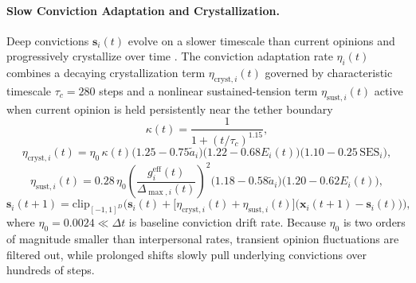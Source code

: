 \documentclass{article}
\begin{document}
\paragraph{Slow Conviction Adaptation and Crystallization.}
Deep convictions $\mathbf{s}_i(t)$ evolve on a slower timescale than current opinions and progressively crystallize over time \citep{alwin1991aging, kiley2020measuring}. The conviction adaptation rate $\eta_i(t)$ combines a decaying crystallization term $\eta_{\mathrm{cryst}, i}(t)$ governed by characteristic timescale $\tau_c = 280$ steps and a nonlinear sustained-tension term $\eta_{\mathrm{sust}, i}(t)$ active when current opinion is held persistently near the tether boundary
\begin{equation}
    \kappa(t) = \frac{1}{1 + (t / \tau_c)^{1.15}},
    \label{eq:crystallization_factor}
\end{equation}
\begin{equation}
    \eta_{\mathrm{cryst}, i}(t) = \eta_0 \,\kappa(t) \big(1.25 - 0.75\tilde{a}_i\big)\big(1.22 - 0.68 E_i(t)\big)\big(1.10 - 0.25\,\mathrm{SES}_i\big),
    \label{eq:eta_cryst}
\end{equation}
\begin{equation}
    \eta_{\mathrm{sust}, i}(t) = 0.28\,\eta_0 \left(\frac{g_i^{\mathrm{eff}}(t)}{\Delta_{\max, i}(t)}\right)^2 \big(1.18 - 0.58\tilde{a}_i\big)\big(1.20 - 0.62 E_i(t)\big),
    \label{eq:eta_sustained}
\end{equation}
\begin{equation}
    \mathbf{s}_i(t+1) = \mathrm{clip}_{[-1, 1]^D}\!\Big(\mathbf{s}_i(t) + \big[\eta_{\mathrm{cryst}, i}(t) + \eta_{\mathrm{sust}, i}(t)\big]\big(\mathbf{x}_i(t+1) - \mathbf{s}_i(t)\big)\Big),
    \label{eq:conviction_update}
\end{equation}
where $\eta_0 = 0.0024 \ll \Delta t$ is baseline conviction drift rate. Because $\eta_0$ is two orders of magnitude smaller than interpersonal rates, transient opinion fluctuations are filtered out, while prolonged shifts slowly pull underlying convictions over hundreds of steps.
\end{document}
